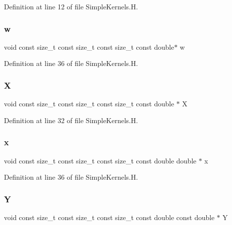 Definition at line 12 of file Simple\+Kernels.\+H.

\hypertarget{SimpleKernels_8H_a953d166eae3bf40a9a6377b7345da431}{}\label{SimpleKernels_8H_a953d166eae3bf40a9a6377b7345da431} 
\subsubsection{\texorpdfstring{w}{w}}
{\footnotesize\ttfamily void const size\+\_\+t const size\+\_\+t const size\+\_\+t const double$\ast$ w}



Definition at line 36 of file Simple\+Kernels.\+H.

\hypertarget{SimpleKernels_8H_a1d2fc0c1bfd9fbd97521ac2a8082cd60}{}\label{SimpleKernels_8H_a1d2fc0c1bfd9fbd97521ac2a8082cd60} 
\subsubsection{\texorpdfstring{X}{X}}
{\footnotesize\ttfamily void const size\+\_\+t const size\+\_\+t const size\+\_\+t const double $\ast$ X}



Definition at line 32 of file Simple\+Kernels.\+H.

\hypertarget{SimpleKernels_8H_a34a9d6580636e964d3fd783cbf72201b}{}\label{SimpleKernels_8H_a34a9d6580636e964d3fd783cbf72201b} 
\subsubsection{\texorpdfstring{x}{x}}
{\footnotesize\ttfamily void const size\+\_\+t const size\+\_\+t const size\+\_\+t const double double $\ast$ x}



Definition at line 36 of file Simple\+Kernels.\+H.

\hypertarget{SimpleKernels_8H_a4731ec58a5102a3b2d3116eaff33f108}{}\label{SimpleKernels_8H_a4731ec58a5102a3b2d3116eaff33f108} 
\subsubsection{\texorpdfstring{Y}{Y}}
{\footnotesize\ttfamily void const size\+\_\+t const size\+\_\+t const size\+\_\+t const double const double $\ast$ Y}



